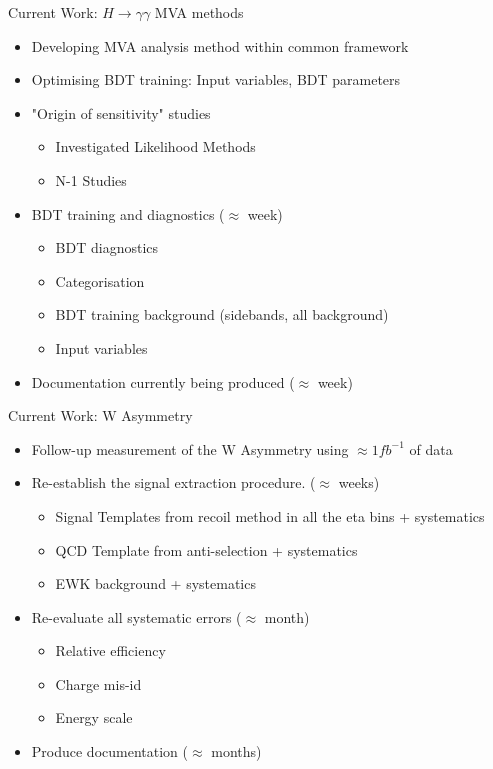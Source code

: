 \documentclass[t]{beamer}
\begin{document}
 \begin{frame}{Current Work: $H\to\gamma\gamma$ MVA methods}
     \begin{itemize}  
       \item Developing MVA analysis method within common framework
       \item Optimising BDT training: Input variables, BDT parameters
       \item "Origin of sensitivity" studies
       \begin{itemize} 
 	      \item Investigated Likelihood Methods
 	      \item N-1 Studies
       \end{itemize}  
       \item BDT training and diagnostics ($\approx$ week)
       \begin{itemize} 
 	      \item BDT diagnostics
 	      \item Categorisation
 	      \item BDT training background (sidebands, all background)
 	      \item Input variables
       \end{itemize}  
 
     \item Documentation currently being produced ($\approx$ week)
     \end{itemize}  
 \end{frame}
 
 \begin{frame}{Current Work: W Asymmetry}
     \begin{itemize}  
       \item Follow-up measurement of the W Asymmetry using $\approx 1fb^{-1}$ of data
       \item Re-establish the signal extraction procedure. ($\approx$ weeks)
       \begin{itemize}  
 	\item Signal Templates from recoil method in all the eta bins + systematics
 	\item QCD Template from anti-selection + systematics
 	\item EWK background + systematics
       \end{itemize}  
       \item Re-evaluate all systematic errors ($\approx$ month)
       \begin{itemize}  
 	\item Relative efficiency
 	\item Charge mis-id
 	\item Energy scale
       \end{itemize}  
       \item Produce documentation ($\approx$ months)
     \end{itemize}  
 \end{frame}
 
\end{document}
